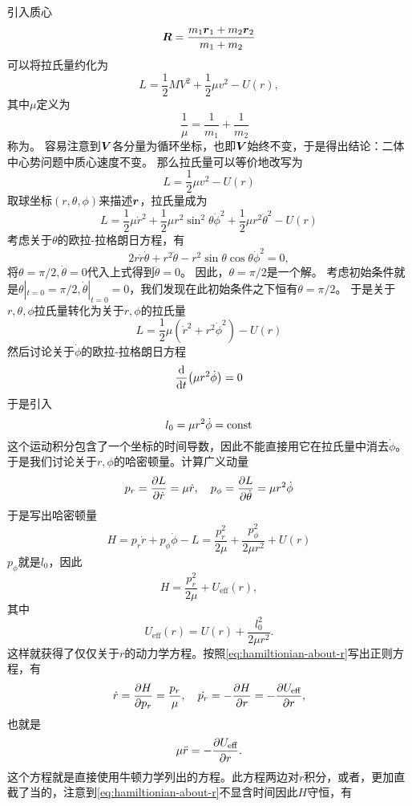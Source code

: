 引入质心
\begin{equation}
    \vb*{R} = \frac{m_1 \vb*{r}_1 + m_2 \vb*{r}_2}{m_1 + m_2}
\end{equation}
可以将拉氏量约化为
\[
    L = \frac{1}{2} M V^2 + \frac{1}{2} \mu v^2 - U(r), 
\]
其中$\mu$定义为
\begin{equation}
    \quad \frac{1}{\mu} = \frac{1}{m_1} + \frac{1}{m_2}
\end{equation}
称为。
容易注意到$\vb*{V}$各分量为循环坐标，也即$\vb*{V}$始终不变，于是得出结论：二体中心势问题中质心速度不变。
那么拉氏量可以等价地改写为
\[
    L = \frac{1}{2} \mu v^2 - U(r)
\]
取球坐标$(r, \theta, \phi)$来描述$\vb*{r}$，拉氏量成为
\[
    L = \frac{1}{2} \mu \dot{r}^2 + \frac{1}{2} \mu r^2 \sin^2 \theta \dot{\phi}^2 + \frac{1}{2} \mu r^2 \dot{\theta}^2 - U(r)
\]
考虑关于$\theta$的欧拉-拉格朗日方程，有
\[
    2 r \dot{r} \dot{\theta} + r^2 \ddot{\theta} - r^2 \sin \theta \cos \theta \dot{\phi}^2 = 0,
\]
将$\theta=\pi/2, \dot{\theta}=0$代入上式得到$\ddot{\theta}=0$。
因此，$\theta=\pi/2$是一个解。
考虑初始条件就是$\theta|_{t=0}=\pi/2, \dot{\theta}|_{t=0}=0$，我们发现在此初始条件之下恒有$\theta=\pi/2$。
于是关于$r, \theta, \phi$拉氏量转化为关于$r, \phi$的拉氏量
\[
    L = \frac{1}{2} \mu (\dot{r}^2 + r^2 \dot{\phi}^2) - U(r)
\]
然后讨论关于$\dot{\phi}$的欧拉-拉格朗日方程
\[
    \dv{t} (\mu r^2 \dot{\phi}) = 0
\]
于是引入
\begin{equation}
    l_0 = \mu r^2 \dot{\phi} = \mathrm{const}
\end{equation}
这个运动积分包含了一个坐标的时间导数，因此不能直接用它在拉氏量中消去$\dot{\phi}$。于是我们讨论关于$r, \phi$的哈密顿量。计算广义动量
\[
    p_r = \pdv{L}{\dot{r}} = \mu \dot{r}, \quad p_\phi = \pdv{L}{\dot{\theta}} = \mu r^2 \dot{\phi}
\]
于是写出哈密顿量
\[
    H = p_r \dot{r} + p_\phi \dot{\phi} - L = \frac{p_r^2}{2\mu} + \frac{p_\phi^2}{2\mu r^2} + U(r)
\]
$p_\phi$就是$l_0$，因此
\begin{equation}
    H = \frac{p_r^2}{2\mu} + U_\text{eff} (r),
    \label{eq:hamiltionian-about-r}
\end{equation}
其中
\begin{equation}
    U_\text{eff} (r) = U(r) + \frac{l_0^2}{2\mu r^2}.
\end{equation}
这样就获得了仅仅关于$r$的动力学方程。按照\eqref{eq:hamiltionian-about-r}写出正则方程，有
\[
    \dot{r} = \pdv{H}{p_r} = \frac{p_r}{\mu}, \quad \dot{p_r} = - \pdv{H}{r} = - \pdv{U_\text{eff}}{r},
\]
也就是
\[
    \mu \ddot{r} = - \pdv{U_\text{eff}}{r}.
\]
这个方程就是直接使用牛顿力学列出的方程。此方程两边对$r$积分，或者，更加直截了当的，注意到\eqref{eq:hamiltionian-about-r}不显含时间因此$H$守恒，有
